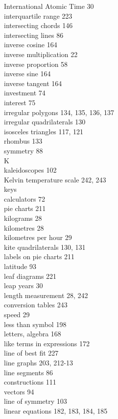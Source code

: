 \documentclass[10pt]{article}
\begin{document}
International Atomic Time 30\\
interquartile range 223\\
intersecting chords 146\\
intersecting lines 86\\
inverse cosine 164\\
inverse multiplication 22\\
inverse proportion 58\\
inverse sine 164\\
inverse tangent 164\\
investment 74\\
interest 75\\
irregular polygons 134, 135, 136, 137\\
irregular quadrilaterals 130\\
isosceles triangles 117, 121\\
rhombus 133\\
symmetry 88\\
K\\
kaleidoscopes 102\\
Kelvin temperature scale 242, 243\\
keys\\
calculators 72\\
pie charts 211\\
kilograms 28\\
kilometres 28\\
kilometres per hour 29\\
kite quadrilaterals 130, 131\\
labels on pie charts 211\\
latitude 93\\
leaf diagrams 221\\
leap years 30\\
length measurement 28, 242\\
conversion tables 243\\
speed 29\\
less than symbol 198\\
letters, algebra 168\\
like terms in expressions 172\\
line of best fit 227\\
line graphs 203, 212-13\\
line segments 86\\
constructions 111\\
vectors 94\\
line of symmetry 103\\
linear equations 182, 183, 184, 185\\
\end{document}
